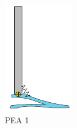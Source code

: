 \begin{figure}[ht!]
\centering
  \begin{subfigure}{.19\textwidth}
    \centering
    \includegraphics[width=\linewidth]{figures/illustration_parallel_prismatic.pdf}
    \caption{PEA 1}
    \label{fig:parallel1}
  \end{subfigure}
  \begin{subfigure}{.19\textwidth}
    \centering

\end{subfigure}
\end{figure}
